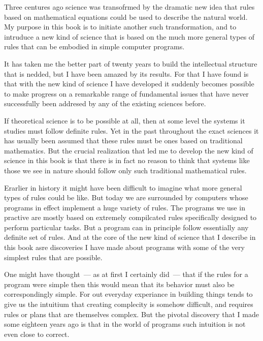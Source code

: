 
Three centures ago science was transofrmed by the dramatic new idea
that rules based on mathematical equations could be used to describe
the natural world. My purpose in this book is to initiate another such
transformation, and to intruduce a new kind of science that is based on
the much more general types of rules that can be embodied in simple
computer programs.

It has taken me the better part of twenty years to build the
intellectual structure that is nedded, but I have been amazed by its
results. For that I have found is that with the new kind of science I
have developed it suddenly becomes possible to make progress on a
remarkable range of fundamental issues that have never successfully
been addresed by any of the existing sciences before.

If theoretical science is to be possible at all, then at some level
the systems it studies must follow definite rules. Yet in the past
throughout the exact sciences it has usually been assumed that these
rules must be ones based on traditional mathematics. But the crucial
realization that led me to develop the new kind of science in this book
is that there is in fact no reason to think that systems like those we see
in nature should follow only such traditional mathematical rules.

Erarlier in history it might have been difficult to imagine what
more general types of rules could be like. But today we are surrounded
by computers whose programs in effect implement a huge variety of
rules. The programs we use in practive are mostly based on extremely
compilcated rules specifically designed to perform particular tasks. But
a program can in principle follow essentially any definite set of rules.
And at the core of the new kind of science that I describe in this book
asre discoveries I have made about programs with some of the very
simplest rules that are possible.

One might have thought\ --- as at first I certainly did\ --- that if the
rules for a program were simple then this would mean that its behavior
must also be correspondingly simple. For out everyday experiance in
building things tends to give us the intuitium that creating complecity is
somehow difficult, and requires rules or plans that are themselves
complex. But the pivotal discovery that I made some eighteen years ago is
that in the world of programs such intuition is not even close to correct.

